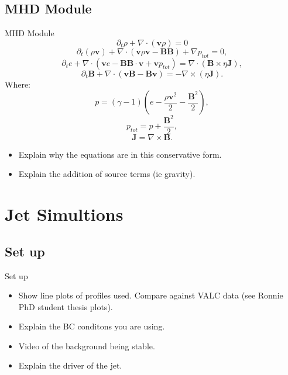 \documentclass{beamer}
\begin{document}
\subsection{MHD Module}
\begin{frame}
\begin{block}{MHD Module}
\begin{equation}
\partial_t \rho + \nabla \cdot ( \mathbf{v} \rho ) = 0
\end{equation}
\begin{equation}
\partial_t (\rho \mathbf{v})+ \nabla \cdot (\mathbf{v} \rho \mathbf{v} - \mathbf{BB}) + \nabla p_{tot} = 0 ,
\end{equation}
\begin{equation}
\partial_t e + \nabla \cdot (\mathbf{v} e - \mathbf{BB} \cdot \mathbf{v}+\mathbf{v} p_{tot}) = \nabla \cdot (\mathbf{B} \times \eta \mathbf{J} ) ,
\end{equation}
\begin{equation}
\partial_t \mathbf{B} + \nabla \cdot (\mathbf{vB}-\mathbf{Bv}) = - \nabla \times (\eta \mathbf{J}) .
\end{equation}
Where:
\begin{equation}
p = (\gamma -1) \left( e -  \frac{\rho \mathbf{v}^2}{2} - \frac{\mathbf{B}^2}{2} \right) ,
\end{equation}
\begin{equation}
p_{tot} = p + \frac{\mathbf{B}^2}{2},
\end{equation}
\begin{equation}
\mathbf{J} = \nabla \times \mathbf{B}.
\end{equation}
\begin{itemize}
\item Explain why the equations are in this conservative form. 
\item Explain the addition of source terms (ie gravity). 
\end{itemize}
\end{block}
\end{frame}
\section{Jet Simultions}
\subsection{Set up}
\begin{frame}
\begin{block}{Set up}
\begin{itemize}
\item Show line plots of profiles used. Compare against VALC data (see Ronnie PhD student thesis plots).
\item Explain the BC conditons you are using.
\item Video of the background being stable. 
\item Explain the driver of the jet.
\end{itemize}
\end{block}
\end{frame}
\end{document}
